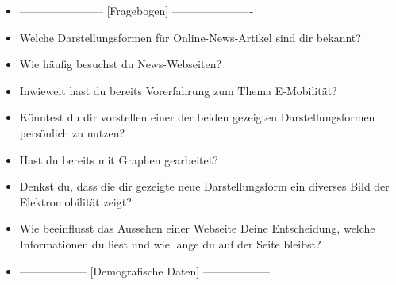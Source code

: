 {\begin{itemize}[]
    \item {-----------------------} [Fragebogen] {----------------------}
    \item {} Welche Darstellungsformen für Online-News-Artikel sind dir bekannt?
    \item {} Wie häufig besuchst du News-Webseiten?
    \item {} Inwieweit hast du bereits Vorerfahrung zum Thema E-Mobilität?
    \item {} Könntest du dir vorstellen einer der beiden gezeigten Darstellungsformen persönlich zu nutzen?
    \item {} Hast du bereits mit Graphen gearbeitet?
    \item {} Denkst du, dass die dir gezeigte neue Darstellungsform ein diverses Bild der Elektromobilität zeigt?
    \item {} Wie beeinflusst das Aussehen einer Webseite Deine Entscheidung, welche Informationen du liest und wie lange du auf der Seite bleibst?
    \item {------------------} [Demografische Daten] {------------------}
\end{itemize}}
\nolinenumbers

